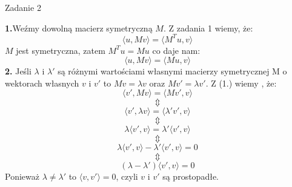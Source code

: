 \documentclass[a4paper]{article}
\begin{document}
\begin{center}
{\fontsize{20}{20}\selectfont Zadanie 2}
\end{center}
\begin{adjustwidth}{30pt}{30pt}
\textbf{1.}Weźmy dowolną macierz symetryczną $M$. Z zadania 1 wiemy, że:
$$\langle u , Mv \rangle = \langle M^{T}u,v \rangle$$
$M$ jest symetryczna, zatem $M^{T}u = Mu$ co daje nam:
$$\langle u , Mv \rangle = \langle Mu,v \rangle$$
\textbf{2.} Jeśli $\lambda$ i $\lambda'$ są różnymi wartościami własnymi macierzy symetrycznej M o wektorach własnych $v$ i $v'$ to $Mv = \lambda v$ oraz $Mv' = \lambda v'$. Z (1.) wiemy , że:
$$\langle v' , Mv \rangle = \langle Mv',v \rangle$$
$$\Updownarrow$$
$$\langle v' , \lambda v \rangle = \langle \lambda' v',v \rangle$$
$$\Updownarrow$$
$$\lambda \langle v' , v \rangle = \lambda' \langle v',v \rangle$$
$$\Updownarrow$$
$$\lambda \langle v' , v \rangle - \lambda' \langle v',v \rangle = 0$$
$$\Updownarrow$$
$$(\lambda - \lambda') \langle v' , v \rangle = 0$$
Ponieważ $\lambda \neq \lambda'$ to $\langle v, v' \rangle = 0$, czyli $v$ i $v'$ są prostopadłe.
\end{adjustwidth}
\end{document}
